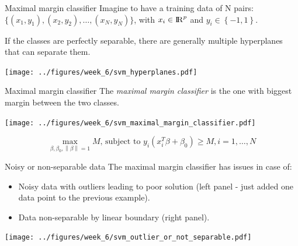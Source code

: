 \documentclass[notes]{beamer}          %
\newcommand{\norm}[1]{\left\lVert#1\right\rVert}
\providecommand{\norm}[1]{\lVert#1\rVert}
\begin{document}
\begin{frame}{Maximal margin classifier}
Imagine to have a training data of N pairs: $\{(x_1, y_1), (x_2, y_2), \dots, (x_N, y_N)\}$, with $x_i \in {\rm I\!R}^p$ and $y_i \in \left\{-1,1 \right\}$.

If the classes are perfectly separable, there are generally multiple hyperplanes that can separate them.

\begin{center}
\texttt{[image: ../figures/week\_6/svm\_hyperplanes.pdf]}
\end{center}

\end{frame}


\begin{frame}{Maximal margin classifier}
The \textit{maximal margin classifier} is the one with biggest margin between the two classes.

\begin{center}
\texttt{[image: ../figures/week\_6/svm\_maximal\_margin\_classifier.pdf]}
\end{center}

\vspace{-7mm} 

\begin{equation*}
\max_{\beta, \beta_0, \norm{\beta} = 1} M \text{, subject to } y_i(x^T_i \beta + \beta_0) \geq M, i=1, \dots, N
\end{equation*}

\end{frame}

\begin{frame}{Noisy or non-separable data}
The maximal margin classifier has issues in case of:
\begin{itemize}
    \item Noisy data with outliers leading to poor solution (left panel - just added one data point to the previous example).
    \item Data non-separable by linear boundary (right panel).
\end{itemize}

\begin{center}
\texttt{[image: ../figures/week\_6/svm\_outlier\_or\_not\_separable.pdf]}  
\end{center}
    
\end{frame}
\end{document}
